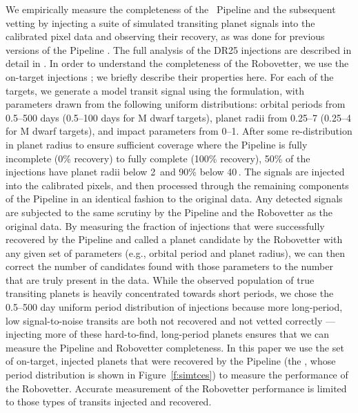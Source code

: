 We empirically measure the completeness of the \Kepler\ Pipeline and the subsequent vetting by injecting a suite of simulated transiting planet signals into the calibrated pixel data and observing their recovery, as was done for previous versions of the \Kepler{} Pipeline \citep{Christiansen2013a,Christiansen2015,Christiansen2016}. The full analysis of the DR25 injections are described in detail in \citet{Christiansen2017}. In order to understand the completeness of the Robovetter, we use the on-target injections \citep[Group 1 in][]{Christiansen2017}; we briefly describe their properties here. For each of the \ninjecttargs{} targets, we generate a model transit signal using the \citet{Mandel2002} formulation, with parameters drawn from the following uniform distributions: orbital periods from 0.5--500 days (0.5--100 days for M dwarf targets), planet radii from 0.25--7 \re{} (0.25--4 \re{} for M dwarf targets), and impact parameters from 0--1. After some re-distribution in planet radius to ensure sufficient coverage where the \Kepler{} Pipeline is fully incomplete (0\% recovery) to fully complete (100\% recovery), 50\% of the injections have planet radii below 2\,\re{} and 90\% below 40\,\re{}. The signals are injected into the calibrated pixels, and then processed through the remaining components of the \Kepler{} Pipeline in an identical fashion to the original data. Any detected signals are subjected to the same scrutiny by the Pipeline and the Robovetter as the original data. By measuring the fraction of injections that were successfully recovered by the Pipeline and called a planet candidate by the Robovetter with any given set of parameters (e.g., orbital period and planet radius), we can then correct the number of candidates found with those parameters to the number that are truly present in the data. While the observed population of true transiting planets is heavily concentrated towards short periods, we chose the 0.5--500 day uniform period distribution of injections because more long-period, low signal-to-noise transits are both not recovered and not vetted correctly --- injecting more of these hard-to-find, long-period planets ensures that we can measure the Pipeline and Robovetter completeness. In this paper we use the set of on-target, injected planets that were recovered by the \Kepler{} Pipeline (the , whose period distribution is shown in Figure~\ref{f:simtces}) to measure the performance of the Robovetter. Accurate measurement of the Robovetter performance is limited to those types of transits injected and recovered.

